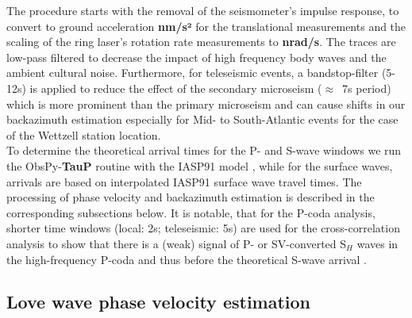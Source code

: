 \documentclass[12pt,reqno,letter]{article}
\begin{document}
The procedure starts with the removal of the seismometer’s impulse response, to convert to ground acceleration \textbf{nm/s²} for the translational measurements and the scaling of the ring laser's rotation rate measurements to \textbf{nrad/s}. The traces are low-pass filtered to decrease the impact of high frequency body waves and the ambient cultural noise. Furthermore, for teleseismic events, a bandstop-filter (5-12s) is applied to reduce the effect of the secondary microseism ($\approx$~7s period) which is more prominent than the primary microseism \citep{Hadziioannou2012} and can cause shifts in our backazimuth estimation especially for Mid- to South-Atlantic events for the case of the Wettzell station location.\\
To determine the theoretical arrival times for the P- and S-wave windows we run the ObsPy-\textbf{TauP}  \citep{Crotwell1999} routine with the IASP91 model \citep{Kennett1991}, while for the surface waves, arrivals are based on interpolated IASP91 surface wave travel times. The processing of phase velocity and backazimuth estimation is described in the corresponding subsections below.
It is notable, that for the P-coda analysis, shorter time windows (local: 2s; teleseismic: 5s) are used for the cross-correlation analysis to show that there is a (weak) signal of P- or SV-converted S$_H$ waves in the high-frequency P-coda and thus before the theoretical S-wave arrival \citep{Pham2009}.

%
\subsection*{Love wave phase velocity estimation}
\label{subsec:pv}
\end{document}
